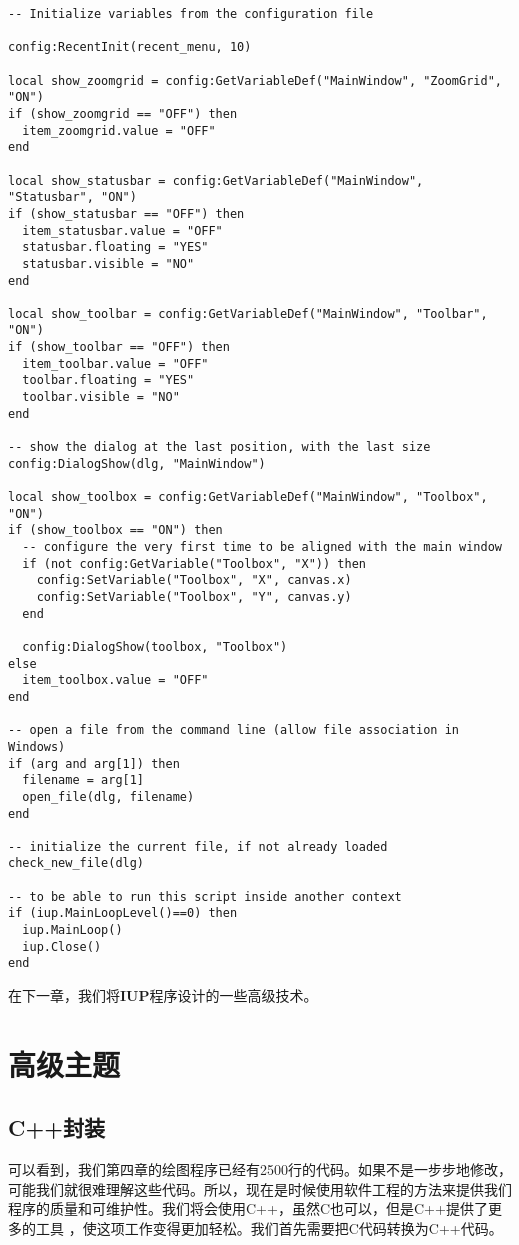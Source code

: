\documentclass{ctexart}
\begin{document}
\begin{lstlisting}
-- Initialize variables from the configuration file

config:RecentInit(recent_menu, 10)

local show_zoomgrid = config:GetVariableDef("MainWindow", "ZoomGrid", "ON")
if (show_zoomgrid == "OFF") then
  item_zoomgrid.value = "OFF"
end
 
local show_statusbar = config:GetVariableDef("MainWindow", "Statusbar", "ON")
if (show_statusbar == "OFF") then
  item_statusbar.value = "OFF"
  statusbar.floating = "YES"
  statusbar.visible = "NO"
end

local show_toolbar = config:GetVariableDef("MainWindow", "Toolbar", "ON")
if (show_toolbar == "OFF") then
  item_toolbar.value = "OFF"
  toolbar.floating = "YES"
  toolbar.visible = "NO"
end

-- show the dialog at the last position, with the last size
config:DialogShow(dlg, "MainWindow")

local show_toolbox = config:GetVariableDef("MainWindow", "Toolbox", "ON")
if (show_toolbox == "ON") then
  -- configure the very first time to be aligned with the main window
  if (not config:GetVariable("Toolbox", "X")) then
    config:SetVariable("Toolbox", "X", canvas.x)
    config:SetVariable("Toolbox", "Y", canvas.y)
  end
  
  config:DialogShow(toolbox, "Toolbox")
else
  item_toolbox.value = "OFF"
end

-- open a file from the command line (allow file association in Windows)
if (arg and arg[1]) then
  filename = arg[1]
  open_file(dlg, filename)
end

-- initialize the current file, if not already loaded
check_new_file(dlg)

-- to be able to run this script inside another context
if (iup.MainLoopLevel()==0) then
  iup.MainLoop()
  iup.Close()
end
\end{lstlisting}

在下一章，我们将\textbf{IUP}程序设计的一些高级技术。

\section{高级主题}

\subsection{C++封装}

可以看到，我们第四章的绘图程序已经有2500行的代码。如果不是一步步地修改，
可能我们就很难理解这些代码。所以，现在是时候使用软件工程的方法来提供我们
程序的质量和可维护性。我们将会使用C++，虽然C也可以，但是C++提供了更多的工具
，使这项工作变得更加轻松。我们首先需要把C代码转换为C++代码。
\end{document}
